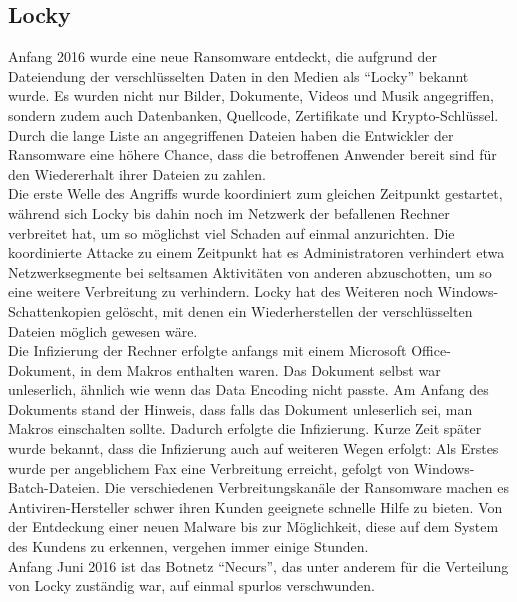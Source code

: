 \subsection{Locky}
Anfang 2016\cite{locky:start} wurde eine neue Ransomware entdeckt, die aufgrund der Dateiendung der verschlüsselten Daten in den Medien als ``Locky'' bekannt wurde. Es wurden nicht nur Bilder, Dokumente, Videos und Musik angegriffen, sondern zudem auch Datenbanken, Quellcode, Zertifikate und Krypto-Schlüssel. Durch die lange Liste an angegriffenen Dateien haben die Entwickler der Ransomware eine höhere Chance, dass die betroffenen Anwender bereit sind für den Wiedererhalt ihrer Dateien zu zahlen.\\
Die erste Welle des Angriffs wurde koordiniert zum gleichen Zeitpunkt gestartet, während sich Locky bis dahin noch im Netzwerk der befallenen Rechner verbreitet hat, um so möglichst viel Schaden auf einmal anzurichten. Die koordinierte Attacke zu einem Zeitpunkt hat es Administratoren verhindert etwa Netzwerksegmente bei seltsamen Aktivitäten von anderen abzuschotten, um so eine weitere Verbreitung zu verhindern. Locky hat des Weiteren noch Windows-Schattenkopien gelöscht, mit denen ein Wiederherstellen der verschlüsselten Dateien möglich gewesen wäre.\\

Die Infizierung der Rechner erfolgte anfangs mit einem Microsoft Office-Dokument, in dem Makros enthalten waren\cite{locky:infection}. Das Dokument selbst war unleserlich, ähnlich wie wenn das Data Encoding nicht passte. Am Anfang des Dokuments stand der Hinweis, dass falls das Dokument unleserlich sei, man Makros einschalten sollte. Dadurch erfolgte die Infizierung. Kurze Zeit später wurde bekannt, dass die Infizierung auch auf weiteren Wegen erfolgt: Als Erstes wurde per angeblichem Fax eine Verbreitung erreicht\cite{locky:fax}, gefolgt von Windows-Batch-Dateien\cite{locky:batch}. Die verschiedenen Verbreitungskanäle der Ransomware machen es Antiviren-Hersteller schwer ihren Kunden geeignete schnelle Hilfe zu bieten. Von der Entdeckung einer neuen Malware bis zur Möglichkeit, diese auf dem System des Kundens zu erkennen, vergehen immer einige Stunden.\\

Anfang Juni 2016\cite{locky:end} ist das Botnetz ``Necurs'', das unter anderem für die Verteilung von Locky zuständig war, auf einmal spurlos verschwunden.

		
